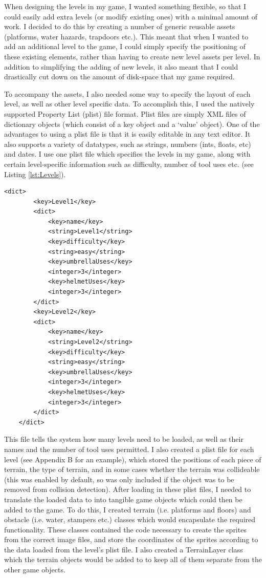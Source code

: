 \documentclass[a4paper,oneside]{report}
\begin{document}
When designing the levels in my game, I wanted something flexible, so that I could easily add extra levels (or modify existing ones) with a minimal amount of work. I decided to do this by creating a number of generic reusable assets (platforms, water hazards, trapdoors etc.). This meant that when I wanted to add an additional level to the game, I could simply specify the positioning of these existing elements, rather than having to create new level assets per level. In addition to simplifying the adding of new levels, it also meant that I could drastically cut down on the amount of disk-space that my game required.

To accompany the assets, I also needed some way to specify the layout of each level, as well as other level specific data. To accomplish this, I used the natively supported Property List (plist) file format. Plist files are simply XML files of dictionary objects (which consist of a key object and a `value' object). One of the advantages to using a plist file is that it is easily editable in any text editor. It also supports a variety of datatypes, such as strings, numbers (ints, floats, etc) and dates. I use one plist file which specifies the levels in my game, along with certain level-specific information such as difficulty, number of tool uses etc. (see Listing \ref{lst:Levels}). 

\begin{lstlisting}[label={lst:Levels},caption=An Example Level List]
    <dict>
    	<key>Level1</key>
    	<dict>
    		<key>name</key>
    		<string>Level1</string>
    		<key>difficulty</key>
    		<string>easy</string>
    		<key>umbrellaUses</key>
    		<integer>3</integer>
    		<key>helmetUses</key>
    		<integer>3</integer>
    	</dict>
    	<key>Level2</key>
	    <dict>
    		<key>name</key>
    		<string>Level2</string>
    		<key>difficulty</key>
    		<string>easy</string>
    		<key>umbrellaUses</key>
    		<integer>3</integer>
    		<key>helmetUses</key>
    		<integer>3</integer>
    	</dict>
    </dict>
\end{lstlisting}

This file tells the system how many levels need to be loaded, as well as their names and the number of tool uses permitted. I also created a plist file for each level (see Appendix B for an example), which stored the positions of each piece of terrain, the type of terrain, and in some cases whether the terrain was collideable (this was enabled by default, so was only included if the object was to be removed from collision detection). After loading in these plist files, I needed to translate the loaded data to into tangible game objects which could then be added to the game. To do this, I created terrain (i.e. platforms and floors) and obstacle (i.e. water, stampers etc.) classes which would encapsulate the required functionality. These classes contained the code necessary to create the sprites from the correct image files, and store the coordinates of the sprites according to the data loaded from the level's plist file. I also created a TerrainLayer class which the terrain objects would be added to to keep all of them separate from the other game objects.
\end{document}
